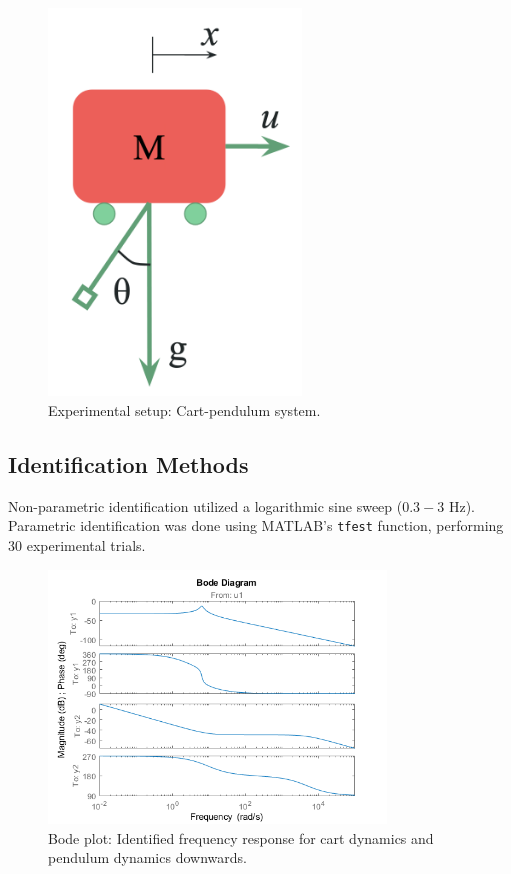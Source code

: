 \documentclass[12pt]{article}
\begin{document}
\begin{figure}[H]
    \centering
    \includegraphics[width=0.6\textwidth]{figures/system_setup.png}
    \caption{Experimental setup: Cart-pendulum system.}
    \label{fig:setup}
\end{figure}

\subsection{Identification Methods}

Non-parametric identification utilized a logarithmic sine sweep ($0.3-3$ Hz). Parametric identification was done using MATLAB's \texttt{tfest} function, performing 30 experimental trials.

\begin{figure}[H]
    \centering
    \includegraphics[width=0.8\textwidth]{../plots/bode_down.png}
    \caption{Bode plot: Identified frequency response for cart dynamics and pendulum dynamics downwards.}
    \label{fig:bode_down}
\end{figure}
\end{document}
